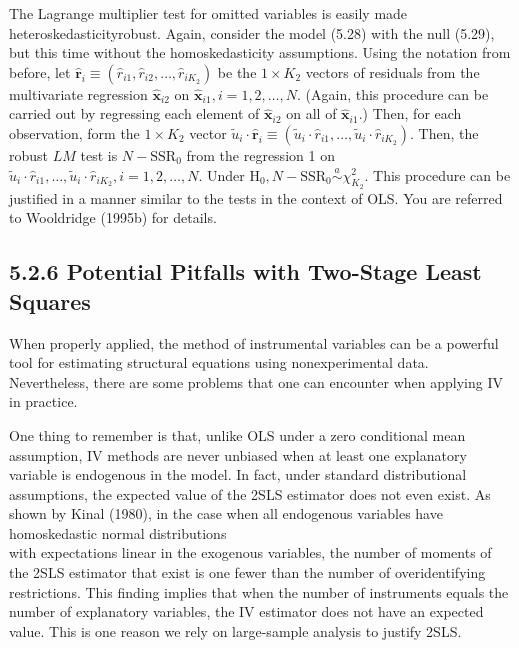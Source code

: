 \documentclass[10pt]{article}
\begin{document}
The Lagrange multiplier test for omitted variables is easily made heteroskedasticityrobust. Again, consider the model (5.28) with the null (5.29), but this time without the homoskedasticity assumptions. Using the notation from before, let $\hat{\mathbf{r}}_{i} \equiv \left(\hat{r}_{i 1}, \hat{r}_{i 2}, \ldots, \hat{r}_{i K_{2}}\right)$ be the $1 \times K_{2}$ vectors of residuals from the multivariate regression $\hat{\mathbf{x}}_{i 2}$ on $\hat{\mathbf{x}}_{i 1}, i=1,2, \ldots, N$. (Again, this procedure can be carried out by regressing each element of $\hat{\mathbf{x}}_{i 2}$ on all of $\hat{\mathbf{x}}_{i 1}$.) Then, for each observation, form the $1 \times K_{2}$ vector $\tilde{u}_{i} \cdot \hat{\mathbf{r}}_{i} \equiv\left(\tilde{u}_{i} \cdot \hat{r}_{i 1}, \ldots, \tilde{u}_{i} \cdot \hat{r}_{i K_{2}}\right)$. Then, the robust $L M$ test is $N-\mathrm{SSR}_{0}$ from the regression 1 on $\tilde{u}_{i} \cdot \hat{r}_{i 1}, \ldots, \tilde{u}_{i} \cdot \hat{r}_{i K_{2}}, i=1,2, \ldots, N$. Under $\mathrm{H}_{0}, N-\mathrm{SSR}_{0} \stackrel{a}{\sim} \chi_{K_{2}}^{2}$. This procedure can be justified in a manner similar to the tests in the context of OLS. You are referred to Wooldridge (1995b) for details.

\subsection*{5.2.6 Potential Pitfalls with Two-Stage Least Squares}
When properly applied, the method of instrumental variables can be a powerful tool for estimating structural equations using nonexperimental data. Nevertheless, there are some problems that one can encounter when applying IV in practice.

One thing to remember is that, unlike OLS under a zero conditional mean assumption, IV methods are never unbiased when at least one explanatory variable is endogenous in the model. In fact, under standard distributional assumptions, the expected value of the 2SLS estimator does not even exist. As shown by Kinal (1980), in the case when all endogenous variables have homoskedastic normal distributions\\
with expectations linear in the exogenous variables, the number of moments of the 2SLS estimator that exist is one fewer than the number of overidentifying restrictions. This finding implies that when the number of instruments equals the number of explanatory variables, the IV estimator does not have an expected value. This is one reason we rely on large-sample analysis to justify 2SLS.
\end{document}
